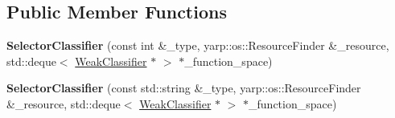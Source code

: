 \subsection*{Public Member Functions}
\begin{DoxyCompactItemize}
\item 
{\bfseries Selector\+Classifier} (const int \&\+\_\+type, yarp\+::os\+::\+Resource\+Finder \&\+\_\+resource, std\+::deque$<$ \hyperlink{classiCub_1_1boostMIL_1_1WeakClassifier}{Weak\+Classifier} $\ast$ $>$ $\ast$\+\_\+function\+\_\+space)\label{classiCub_1_1boostMIL_1_1SelectorClassifier_a7f5e09f2339e009655690c35c9c66919}

\item 
{\bfseries Selector\+Classifier} (const std\+::string \&\+\_\+type, yarp\+::os\+::\+Resource\+Finder \&\+\_\+resource, std\+::deque$<$ \hyperlink{classiCub_1_1boostMIL_1_1WeakClassifier}{Weak\+Classifier} $\ast$ $>$ $\ast$\+\_\+function\+\_\+space)\label{classiCub_1_1boostMIL_1_1SelectorClassifier_a72a52fc40618bf7b1fa8f2adf446d625}


\end{DoxyCompactItemize}
